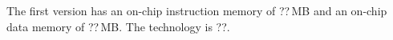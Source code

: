The first version has an on-chip instruction memory of ??\,MB and an on-chip data memory of ??\,MB. The technology is ??.